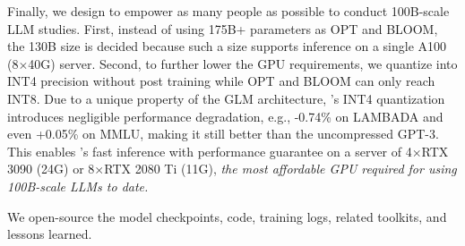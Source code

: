 Finally, we design \glm to empower as many people as possible to conduct 100B-scale LLM studies. 
First, instead of using 175B+ parameters as OPT and BLOOM, the 130B size is decided because such a size supports inference on a single A100 (8$\times$40G) server. 
Second, to further lower the GPU requirements, we quantize \glm into INT4 precision without post training  while OPT and BLOOM can only reach INT8. 
Due to a unique property of the GLM architecture, \glm's INT4 quantization introduces negligible performance degradation, e.g., -0.74\% on LAMBADA and even +0.05\% on MMLU, making it still better than the uncompressed GPT-3. 
This enables \glm's fast inference with performance guarantee on a server of 4$\times$RTX 3090 (24G) or 8$\times$RTX 2080 Ti (11G), \textit{the most affordable GPU required for using 100B-scale LLMs to date. }

We open-source the model checkpoints, code, training logs, related toolkits, and lessons learned. 

